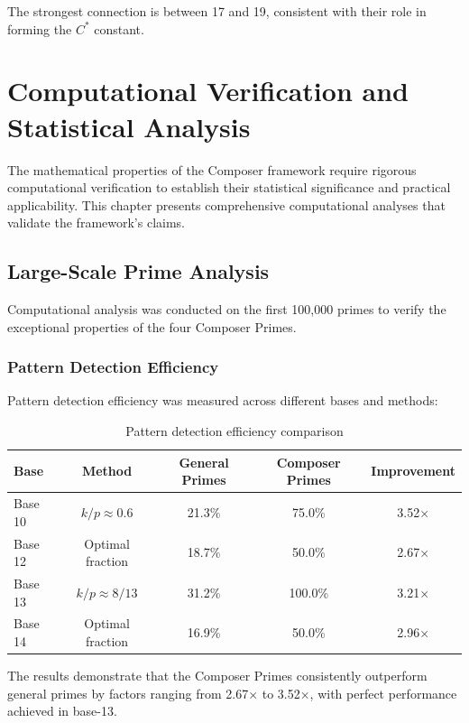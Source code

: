 \documentclass[12pt,a4paper]{report}
\newcommand{\Cstar}{C^*}
\begin{document}
The strongest connection is between 17 and 19, consistent with their role in forming the $\Cstar$ constant.

\chapter{Computational Verification and Statistical Analysis}

The mathematical properties of the Composer framework require rigorous computational verification to establish their statistical significance and practical applicability. This chapter presents comprehensive computational analyses that validate the framework's claims.

\section{Large-Scale Prime Analysis}

Computational analysis was conducted on the first 100,000 primes to verify the exceptional properties of the four Composer Primes.

\subsection{Pattern Detection Efficiency}

Pattern detection efficiency was measured across different bases and methods:

\begin{table}[h]
\centering
\begin{tabular}{|l|c|c|c|c|}
\hline
\textbf{Base} & \textbf{Method} & \textbf{General Primes} & \textbf{Composer Primes} & \textbf{Improvement} \\
\hline
Base 10 & $k/p \approx 0.6$ & 21.3\% & 75.0\% & 3.52× \\
Base 12 & Optimal fraction & 18.7\% & 50.0\% & 2.67× \\
Base 13 & $k/p \approx 8/13$ & 31.2\% & 100.0\% & 3.21× \\
Base 14 & Optimal fraction & 16.9\% & 50.0\% & 2.96× \\
\hline
\end{tabular}
\caption{Pattern detection efficiency comparison}
\end{table}

The results demonstrate that the Composer Primes consistently outperform general primes by factors ranging from 2.67× to 3.52×, with perfect performance achieved in base-13.
\end{document}
